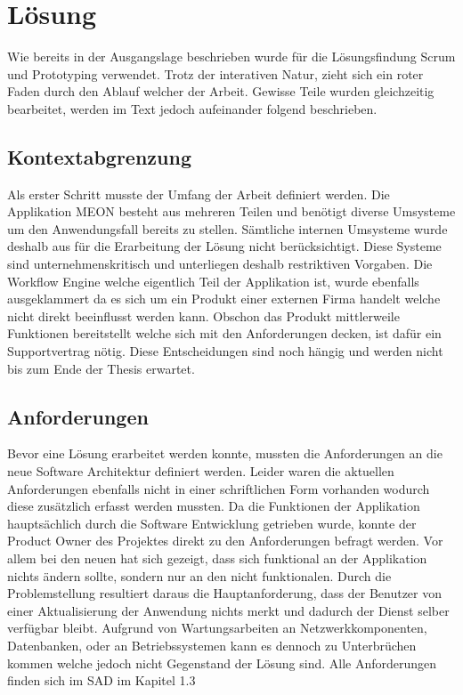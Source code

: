 \graphicspath{{./images/}}

\chapter{Lösung}

Wie bereits in der Ausgangslage beschrieben wurde für die Lösungsfindung Scrum und Prototyping verwendet. Trotz der interativen Natur, zieht sich ein roter Faden durch den Ablauf welcher der Arbeit. Gewisse Teile wurden gleichzeitig bearbeitet, werden im Text jedoch aufeinander folgend beschrieben.

\section{Kontextabgrenzung}

Als erster Schritt musste der Umfang der Arbeit definiert werden. Die Applikation MEON besteht aus mehreren Teilen und benötigt diverse Umsysteme um den Anwendungsfall bereits zu stellen. Sämtliche internen Umsysteme wurde deshalb aus für die Erarbeitung der Lösung nicht berücksichtigt. Diese Systeme sind unternehmenskritisch und unterliegen deshalb restriktiven Vorgaben. Die Workflow Engine welche eigentlich Teil der Applikation ist, wurde ebenfalls ausgeklammert da es sich um ein Produkt einer externen Firma handelt welche nicht direkt beeinflusst werden kann. Obschon das Produkt mittlerweile Funktionen bereitstellt welche sich mit den Anforderungen decken, ist dafür ein Supportvertrag nötig. Diese Entscheidungen sind noch hängig und werden nicht bis zum Ende der Thesis erwartet.

\section{Anforderungen}

Bevor eine Lösung erarbeitet werden konnte, mussten die Anforderungen an die neue Software Architektur definiert werden. Leider waren die aktuellen Anforderungen ebenfalls nicht in einer schriftlichen Form vorhanden wodurch diese zusätzlich erfasst werden mussten. Da die Funktionen der Applikation hauptsächlich durch die Software Entwicklung getrieben wurde, konnte der Product Owner des Projektes direkt zu den Anforderungen befragt werden. Vor allem bei den neuen hat sich gezeigt, dass sich funktional an der Applikation nichts ändern sollte, sondern nur an den nicht funktionalen. Durch die Problemstellung resultiert daraus die Hauptanforderung, dass der Benutzer von einer Aktualisierung der Anwendung nichts merkt und dadurch der Dienst selber verfügbar bleibt. Aufgrund von Wartungsarbeiten an Netzwerkkomponenten, Datenbanken, oder an Betriebssystemen kann es dennoch zu Unterbrüchen kommen welche jedoch nicht Gegenstand der Lösung sind. Alle Anforderungen finden sich im SAD im Kapitel 1.3


